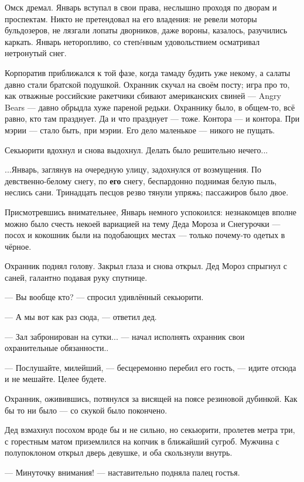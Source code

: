 Омск дремал.
Январь вступал в свои права, неслышно проходя по дворам и проспектам.
Никто не претендовал на его владения: не ревели моторы бульдозеров,
не лязгали лопаты дворников, даже вороны, казалось, разучились каркать.
Январь неторопливо, со степ\'eнным удовольствием осматривал нетронутый снег.

Корпоратив приближался к той фазе, когда тамаду будить уже некому, а салаты давно стали братской подушкой.
Охранник скучал на своём посту; игра про то, как отважные российские ракетчики сбивают американских свиней ---
Angry Bears --- давно обрыдла хуже пареной редьки. Охраннику было, в общем-то, всё равно, кто там празднует.
Да и что празднует --- тоже. Контора --- и контора. При мэрии --- стало быть, при мэрии.
Его дело маленькое --- никого не пущать.

Секьюрити вдохнул и снова выдохнул. Делать было решительно нечего...

...Январь, заглянув на очередную улицу, задохнулся от возмущения.
По девственно-белому снегу, по \textbf{его} снегу, беспардонно поднимая белую пыль, неслись сани.
Тринадцать песцов резво тянули упряжь; пассажиров было двое.

Присмотревшись внимательнее, Январь немного успокоился:
незнакомцев вполне можно было счесть некоей вариацией на тему Деда Мороза и Снегурочки ---
посох и кокошник были на подобающих местах --- только почему-то одетых в чёрное.

Охранник поднял голову. Закрыл глаза и снова открыл.
Дед Мороз спрыгнул с саней, галантно подавая руку спутнице.

 --- Вы вообще кто? --- спросил удивлённый секьюрити.

 --- А мы вот как раз сюда, --- ответил дед.

 --- Зал забронирован на сутки... --- начал исполнять охранник свои охранительные обязанности..

 --- Послушайте, милейший, --- бесцеремонно перебил его гость, --- идите отсюда и не мешайте. Целее будете.

Охранник, оживившись, потянулся за висящей на поясе резиновой дубинкой.
Как бы то ни было --- со скукой было покончено.

Дед взмахнул посохом вроде бы и не сильно, но секьюрити, пролетев метра три,
с горестным матом приземлился на копчик в ближайший сугроб.
Мужчина с полупоклоном открыл дверь девушке, и оба скользнули внутрь.

 --- Минуточку внимания! --- наставительно подняла палец гостья.

